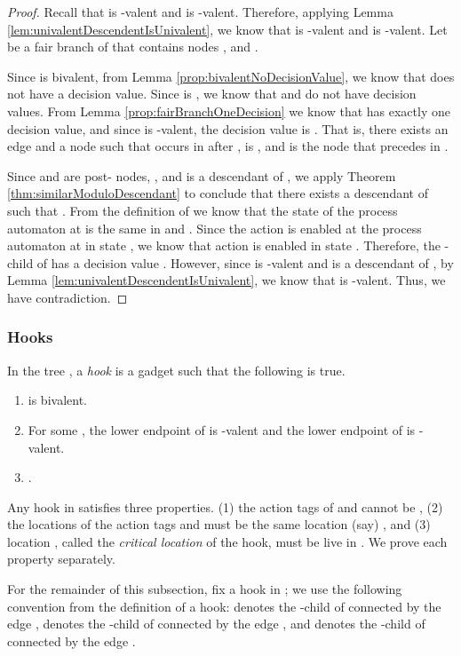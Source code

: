 \documentclass[11pt]{article}
\numberwithin{theorem}{section}
\begin{document}
\begin{proof}
Recall that  is -valent and  is -valent. Therefore, applying Lemma \ref{lem:univalentDescendentIsUnivalent}, we know that  is -valent and   is -valent. Let  be a fair branch of  that contains nodes ,  and .

Since  is bivalent, from Lemma \ref{prop:bivalentNoDecisionValue}, we know that  does not have a decision value. Since  is , we know that  and  do not have decision values. From Lemma \ref{prop:fairBranchOneDecision} we know that  has exactly one decision value, and since  is -valent, the decision value is . 
 That is, there exists an edge  and a node  such that  occurs in  after ,  is , and  is the node that precedes  in . 
 
  Since  and  are post- nodes, , and  is a descendant of , we apply Theorem \ref{thm:similarModuloDescendant} to conclude that there exists a descendant  of  such that . From the definition of  we know that the state of the process automaton at  is the same in  and . Since the action  is enabled at the process automaton at  in state , we know that action  is enabled in state . Therefore, the -child  of  has a decision value . However, since   is -valent and  is a descendant of , by Lemma \ref{lem:univalentDescendentIsUnivalent}, we know that  is -valent. Thus, we have contradiction.
\end{proof}






\subsubsection{Hooks}
\label{subsubsec:HookProperties}

In the tree , a \emph{hook} is a gadget  such that the following is true.
\begin{enumerate}
 \item  is bivalent.
 \item For some , the lower endpoint  of  is -valent and the lower endpoint  of  is -valent.  
\item .
\end{enumerate}


Any hook  in  satisfies three properties. (1) the action tags of  and  cannot be , (2) the locations of the action tags  and  must be the same location (say) , and (3) location , called the \emph{critical location} of the hook, must be live in . We prove each property separately.

For the remainder of this subsection, fix a hook  in ; we use the following convention from the definition of a hook:  denotes the -child of  connected by the edge ,  denotes the -child of  connected by the edge , and  denotes the -child of  connected by the edge .
\end{document}
